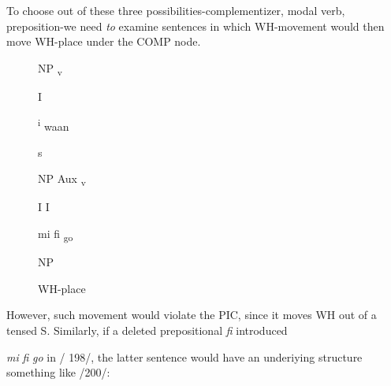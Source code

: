 To choose out of these three possibilities-complementizer, modal verb, preposition-we need \textit{to }examine sentences in which
WH-movement would then move WH-place under the COMP node.

\begin{figure}
NP \textsubscript{v}

I 

\textsuperscript{i} waan

s

NP Aux \textsubscript{v}

I I 

mi fi \textsubscript{go}

NP

WH-place
\end{figure}



However, such movement would violate the PIC, since it moves WH out of a tensed S. Similarly, if a deleted prepositional \textit{fi} introduced

\ea\label{ex:201}
 \z

\textit{mi} \textit{fi} \textit{go} in / 198/, the latter sentence would have an underiying structure something like /200/:

